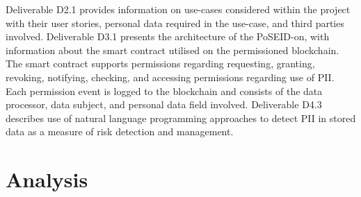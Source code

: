 Deliverable D2.1 \cite{noauthor_d2.1_2018} provides information on use-cases considered within the project with their user stories, personal data required in the use-case, and third parties involved. Deliverable D3.1 \cite{noauthor_d3.1_2019} presents the architecture of the PoSEID-on, with information about the smart contract utilised on the permissioned blockchain. The smart contract supports permissions regarding requesting, granting, revoking, notifying, checking, and accessing permissions regarding use of PII. Each permission event is logged to the blockchain and consists of the data processor, data subject, and personal data field involved. Deliverable D4.3 \cite{noauthor_d4.3_2019} describes use of natural language programming approaches to detect PII in stored data as a measure of risk detection and management.

\section{Analysis}\label{sec:sota:analysis}

